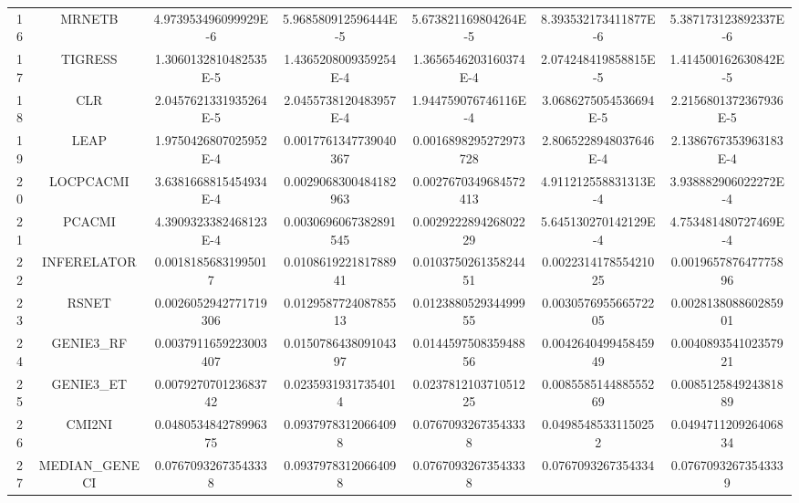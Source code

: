 \documentclass[a4paper,10pt]{article}
\begin{document}
\begin{landscape}
\begin{table}[!htp]
\begin{tabular}{ccccccc}
16&MRNETB&4.973953496099929E-6&5.968580912596444E-5&5.673821169804264E-5&8.393532173411877E-6&5.387173123892337E-6\\
17&TIGRESS&1.3060132810482535E-5&1.4365208009359254E-4&1.3656546203160374E-4&2.074248419858815E-5&1.414500162630842E-5\\
18&CLR&2.0457621331935264E-5&2.0455738120483957E-4&1.944759076746116E-4&3.0686275054536694E-5&2.2156801372367936E-5\\
19&LEAP&1.9750426807025952E-4&0.0017761347739040367&0.0016898295272973728&2.8065228948037646E-4&2.1386767353963183E-4\\
20&LOCPCACMI&3.6381668815454934E-4&0.0029068300484182963&0.0027670349684572413&4.911212558831313E-4&3.938882906022272E-4\\
21&PCACMI&4.3909323382468123E-4&0.0030696067382891545&0.002922289426802229&5.645130270142129E-4&4.753481480727469E-4\\
22&INFERELATOR&0.00181856831995017&0.010861922181788941&0.010375026135824451&0.002231417855421025&0.001965787647775896\\
23&RSNET&0.0026052942771719306&0.012958772408785513&0.012388052934499955&0.003057695566572205&0.002813808860285901\\
24&GENIE3_RF&0.0037911659223003407&0.015078643809104397&0.014459750835948856&0.004264049945845949&0.004089354102357921\\
25&GENIE3_ET&0.007927070123683742&0.02359319317354014&0.023781210371051225&0.008558514488555269&0.008512584924381889\\
26&CMI2NI&0.048053484278996375&0.09379783120664098&0.07670932673543338&0.04985485331150252&0.049471120926406834\\
27&MEDIAN_GENECI&0.07670932673543338&0.09379783120664098&0.07670932673543338&0.0767093267354334&0.07670932673543339\\
\hline
\end{tabular}
\end{table}


\newpage


\end{landscape}
\end{document}

